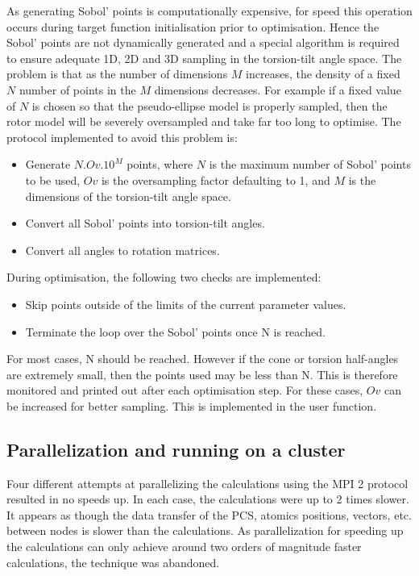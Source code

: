 As generating Sobol' points is computationally expensive, for speed this operation occurs during target function initialisation prior to optimisation.
Hence the Sobol' points are not dynamically generated and a special algorithm is required to ensure adequate 1D, 2D and 3D sampling in the torsion-tilt angle space.
The problem is that as the number of dimensions $M$ increases, the density of a fixed $N$ number of points in the $M$ dimensions decreases.
For example if a fixed value of $N$ is chosen so that the pseudo-ellipse model is properly sampled, then the rotor model will be severely oversampled and take far too long to optimise.
The protocol implemented to avoid this problem is:
\begin{itemize}
    \item Generate $N.Ov.10^M$ points, where $N$ is the maximum number of Sobol' points to be used, $Ov$ is the oversampling factor defaulting to 1, and $M$ is the dimensions of the torsion-tilt angle space.
    \item Convert all Sobol' points into torsion-tilt angles.
    \item Convert all angles to rotation matrices.
\end{itemize}

During optimisation, the following two checks are implemented:
\begin{itemize}
    \item Skip points outside of the limits of the current parameter values.
    \item Terminate the loop over the Sobol' points once N is reached.
\end{itemize}

For most cases, N should be reached.
However if the cone or torsion half-angles are extremely small, then the points used may be less than N.
This is therefore monitored and printed out after each optimisation step.
For these cases, $Ov$ can be increased for better sampling.
This is implemented in the  user function.





\subsection{Parallelization and running on a cluster}

Four different attempts at parallelizing the calculations using the MPI 2 protocol resulted in no speeds up.
In each case, the calculations were up to 2 times slower.
It appears as though the data transfer of the PCS, atomics positions, vectors, etc. between nodes is slower than the calculations.
As parallelization for speeding up the calculations can only achieve around two orders of magnitude faster calculations, the technique was abandoned.




